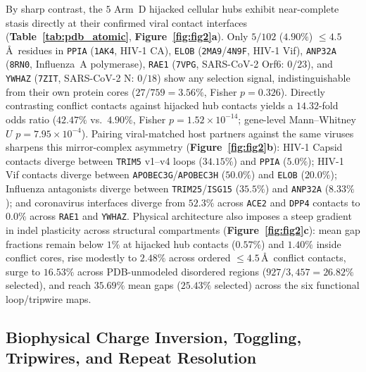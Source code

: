 \documentclass[11pt,letterpaper]{article}
\begin{document}
By sharp contrast, the $5$ Arm~D hijacked cellular hubs exhibit near-complete stasis directly at their confirmed viral contact interfaces (\textbf{Table~\ref{tab:pdb_atomic}}, \textbf{Figure~\ref{fig:fig2}a}). Only $5/102$ ($4.90\%$) $\le 4.5$\,\AA\ residues in \texttt{PPIA} (\texttt{1AK4}, HIV-1 CA), \texttt{ELOB} (\texttt{2MA9}/\texttt{4N9F}, HIV-1 Vif), \texttt{ANP32A} (\texttt{8RN0}, Influenza~A polymerase), \texttt{RAE1} (\texttt{7VPG}, SARS-CoV-2 Orf6: $0/23$), and \texttt{YWHAZ} (\texttt{7ZIT}, SARS-CoV-2 N: $0/18$) show any selection signal, indistinguishable from their own protein cores ($27/759 = 3.56\%$, Fisher $p = 0.326$). Directly contrasting conflict contacts against hijacked hub contacts yields a $14.32$-fold odds ratio ($42.47\%$ vs.\ $4.90\%$, Fisher $p = 1.52 \times 10^{-14}$; gene-level Mann--Whitney $U$ $p = 7.95 \times 10^{-4}$). Pairing viral-matched host partners against the same viruses sharpens this mirror-complex asymmetry (\textbf{Figure~\ref{fig:fig2}b}): HIV-1 Capsid contacts diverge between \texttt{TRIM5} v1--v4 loops ($34.15\%$) and \texttt{PPIA} ($5.0\%$); HIV-1 Vif contacts diverge between \texttt{APOBEC3G}/\texttt{APOBEC3H} ($50.0\%$) and \texttt{ELOB} ($20.0\%$); Influenza antagonists diverge between \texttt{TRIM25}/\texttt{ISG15} ($35.5\%$) and \texttt{ANP32A} ($8.33\%$); and coronavirus interfaces diverge from $52.3\%$ across \texttt{ACE2} and \texttt{DPP4} contacts to $0.0\%$ across \texttt{RAE1} and \texttt{YWHAZ}. Physical architecture also imposes a steep gradient in indel plasticity across structural compartments (\textbf{Figure~\ref{fig:fig2}c}): mean gap fractions remain below $1\%$ at hijacked hub contacts ($0.57\%$) and $1.40\%$ inside conflict cores, rise modestly to $2.48\%$ across ordered $\le 4.5$\,\AA\ conflict contacts, surge to $16.53\%$ across PDB-unmodeled disordered regions ($927/3,457 = 26.82\%$ selected), and reach $35.69\%$ mean gaps ($25.43\%$ selected) across the six functional loop/tripwire maps.

\subsection{Biophysical Charge Inversion, Toggling, Tripwires, and Repeat Resolution}
\end{document}
